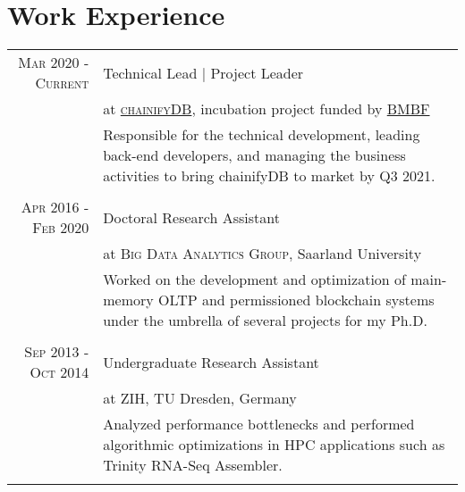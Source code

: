 \documentclass[a4paper,10pt]{article} %
\begin{document}

\section{Work Experience}
\vspace*{0.2cm}
\begin{tabular}{rp{13cm}}
\textsc{Mar 2020 - Current} & Technical Lead | Project Leader \\
& at \href{www.chainifydb.com}{\textsc{chainifyDB}}, incubation project funded by \href{https://www.forschung-it-sicherheit-kommunikationssysteme.de/projekte/chainifydb}{BMBF}\\ 
& \footnotesize{Responsible for the technical development, leading back-end developers, and managing the business activities to bring chainifyDB to market by Q3 2021.}\\
\multicolumn{2}{c}{} \\

	
\textsc{Apr 2016 - Feb 2020} & Doctoral Research Assistant \\
                         &  at \textsc{Big Data Analytics Group}, Saarland University\\ 
& \footnotesize{Worked on the development and optimization of main-memory OLTP and permissioned blockchain systems under the umbrella of several projects for my Ph.D.}\\
\multicolumn{2}{c}{} \\


\textsc{Sep 2013 - Oct 2014} & Undergraduate Research Assistant\\
                         & at \textsc{ZIH}, TU Dresden, Germany \emph{} \\ 
& \footnotesize{Analyzed performance bottlenecks and performed algorithmic optimizations in HPC applications such as Trinity RNA-Seq Assembler.}\\
\multicolumn{2}{c}{} \\
\end{tabular}

\end{document}
